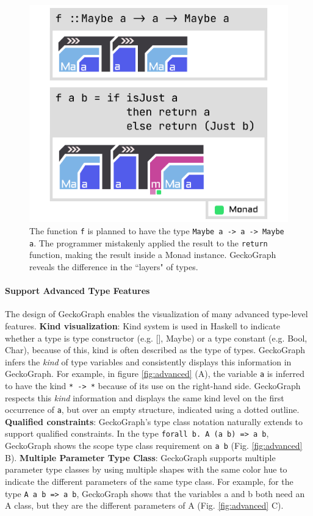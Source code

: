 \documentclass[preprint,12pt]{elsarticle}
\begin{document}
	
\begin{figure}[]
  \includegraphics[width=0.6\linewidth]{figures/Maybe}
  \caption{\label{fig:maybe} The function \texttt{f} is planned to have the type \texttt{Maybe a -> a -> Maybe a}. The programmer mistakenly applied the result to the \texttt{return} function, making the result inside a Monad instance.  GeckoGraph reveals the difference in the ``layers" of types. }
\end{figure}

\paragraph{Support Advanced Type Features}
The design of GeckoGraph enables the visualization of many advanced type-level features. \textbf{Kind visualization}: Kind system \cite{Jones1995-lm} is used in Haskell to indicate whether a type is type constructor (e.g. [], Maybe) or a type constant (e.g. Bool, Char), because of this, kind is often described as the type of types. GeckoGraph infers the {\it kind} of type variables and consistently displays this information in GeckoGraph. For example, in figure \ref{fig:advanced} (A), the variable \texttt{a} is inferred to have the kind \texttt{* -> *} because of its use on the right-hand side. GeckoGraph respects this {\it kind} information and displays the same kind level on the first occurrence of \texttt{a}, but over an empty structure, indicated using a dotted outline. \textbf{Qualified constraints}: GeckoGraph's type class notation naturally extends to support qualified constraints. In the type \texttt{forall b. A (a b) => a b}, GeckoGraph shows the scope type class requirement on \texttt{a b} (Fig. \ref{fig:advanced} B).
\textbf{Multiple Parameter Type Class}:  GeckoGraph supports multiple parameter type classes by using multiple shapes with the same color hue to indicate the different parameters of the same type class. For example, for the type \texttt{A a b => a b},  GeckoGraph shows that the variables a and b both need an A class, but they are the different parameters of A (Fig. \ref{fig:advanced} C).
\end{document}
